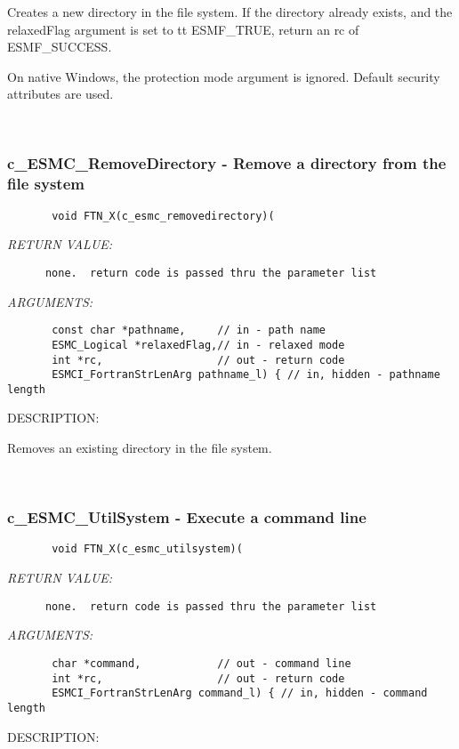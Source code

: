        Creates a new directory in the file system.  If the directory already
       exists, and the relaxedFlag argument is set to {tt ESMF\_TRUE},
       return an rc of ESMF\_SUCCESS.
  
       On native Windows, the protection mode argument is ignored.  Default
       security attributes are used.
   
 
\mbox{}\hrulefill\
 
\subsubsection [c\_ESMC\_RemoveDirectory] {c\_ESMC\_RemoveDirectory - Remove a directory from the file system}


  
\begin{verbatim}       void FTN_X(c_esmc_removedirectory)(\end{verbatim}{\em RETURN VALUE:}
\begin{verbatim}      none.  return code is passed thru the parameter list\end{verbatim}{\em ARGUMENTS:}
\begin{verbatim}       const char *pathname,     // in - path name
       ESMC_Logical *relaxedFlag,// in - relaxed mode
       int *rc,                  // out - return code
       ESMCI_FortranStrLenArg pathname_l) { // in, hidden - pathname length\end{verbatim}
{\sf DESCRIPTION:\\ }


       Removes an existing directory in the file system.
   
 
\mbox{}\hrulefill\
 
\subsubsection [c\_ESMC\_UtilSystem] {c\_ESMC\_UtilSystem - Execute a command line}


  
\begin{verbatim}       void FTN_X(c_esmc_utilsystem)(\end{verbatim}{\em RETURN VALUE:}
\begin{verbatim}      none.  return code is passed thru the parameter list\end{verbatim}{\em ARGUMENTS:}
\begin{verbatim}       char *command,            // out - command line
       int *rc,                  // out - return code
       ESMCI_FortranStrLenArg command_l) { // in, hidden - command length\end{verbatim}
{\sf DESCRIPTION:\\ }



